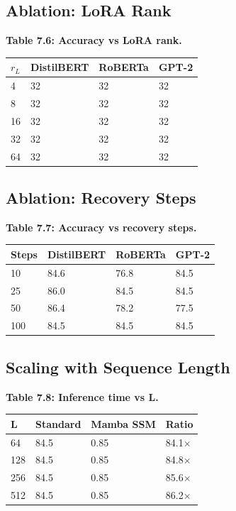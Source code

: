 \subsection{Ablation: LoRA Rank}

\textbf{Table 7.6: Accuracy vs LoRA rank.}

\begin{table}[H]
\centering
\small
\begin{tabular}{llll}
\toprule
\textbf{$r_L$} & \textbf{DistilBERT} & \textbf{RoBERTa} & \textbf{GPT-2} \\
\midrule
4 & 32 & 32 & 32 \\
8 & 32 & 32 & 32 \\
16 & 32 & 32 & 32 \\
32 & 32 & 32 & 32 \\
64 & 32 & 32 & 32 \\
\bottomrule
\end{tabular}
\end{table}

\subsection{Ablation: Recovery Steps}

\textbf{Table 7.7: Accuracy vs recovery steps.}

\begin{table}[H]
\centering
\small
\begin{tabular}{llll}
\toprule
\textbf{Steps} & \textbf{DistilBERT} & \textbf{RoBERTa} & \textbf{GPT-2} \\
\midrule
10 & 84.6 & 76.8 & 84.5 \\
25 & 86.0 & 84.5 & 84.5 \\
50 & 86.4 & 78.2 & 77.5 \\
100 & 84.5 & 84.5 & 84.5 \\
\bottomrule
\end{tabular}
\end{table}

\subsection{Scaling with Sequence Length}

\textbf{Table 7.8: Inference time vs L.}

\begin{table}[H]
\centering
\small
\begin{tabular}{llll}
\toprule
\textbf{L} & \textbf{Standard} & \textbf{Mamba SSM} & \textbf{Ratio} \\
\midrule
64 & 84.5 & 0.85 & 84.1$\times$ \\
128 & 84.5 & 0.85 & 84.8$\times$ \\
256 & 84.5 & 0.85 & 85.6$\times$ \\
512 & 84.5 & 0.85 & 86.2$\times$ \\
\bottomrule
\end{tabular}
\end{table}

